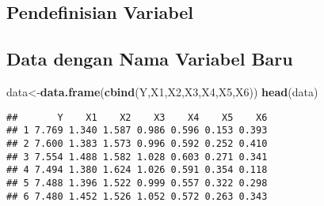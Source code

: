 \documentclass[
]{article}
\newenvironment{Shaded}{\begin{snugshade}}{\end{snugshade}}
\newcommand{\FunctionTok}[1]{\textcolor[rgb]{0.13,0.29,0.53}{\textbf{#1}}}
\newcommand{\NormalTok}[1]{#1}
\newcommand{\OtherTok}[1]{\textcolor[rgb]{0.56,0.35,0.01}{#1}}
\newcommand{\SpecialCharTok}[1]{\textcolor[rgb]{0.81,0.36,0.00}{\textbf{#1}}}
\begin{document}
\hypertarget{pendefinisian-variabel}{%
\subsection{\texorpdfstring{ Pendefinisian
Variabel}{ Pendefinisian Variabel}}\label{pendefinisian-variabel}}

\begin{Shaded}
\end{Shaded}

\hypertarget{data-dengan-nama-variabel-baru}{%
\subsection{\texorpdfstring{ Data dengan Nama Variabel
Baru}{ Data dengan Nama Variabel Baru}}\label{data-dengan-nama-variabel-baru}}

\begin{Shaded}
\begin{Highlighting}[]
\NormalTok{data}\OtherTok{\textless{}{-}}\FunctionTok{data.frame}\NormalTok{(}\FunctionTok{cbind}\NormalTok{(Y,X1,X2,X3,X4,X5,X6))}
\FunctionTok{head}\NormalTok{(data)}
\end{Highlighting}
\end{Shaded}

\begin{verbatim}
##       Y    X1    X2    X3    X4    X5    X6
## 1 7.769 1.340 1.587 0.986 0.596 0.153 0.393
## 2 7.600 1.383 1.573 0.996 0.592 0.252 0.410
## 3 7.554 1.488 1.582 1.028 0.603 0.271 0.341
## 4 7.494 1.380 1.624 1.026 0.591 0.354 0.118
## 5 7.488 1.396 1.522 0.999 0.557 0.322 0.298
## 6 7.480 1.452 1.526 1.052 0.572 0.263 0.343
\end{verbatim}
\end{document}
